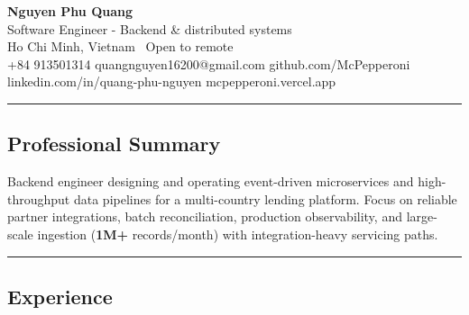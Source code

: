 \documentclass[10pt,letterpaper]{article}
\newcommand{\resumesectionrule}{%
  \par\vspace{0.18em}%
  \noindent\rule{\linewidth}{0.4pt}\par
  \vspace{0.24em}%
}
\begin{document}
\begin{center}
      {\LARGE \textbf{Nguyen Phu Quang}}\\
      \vspace{0.2cm}
      Software Engineer - Backend \& distributed systems\\
      \vspace{0.1cm}
      {\small Ho Chi Minh, Vietnam \textbullet\ Open to remote}
      \vspace{0.35cm}
      \\
      {\small +84 913501314 \quad\textbullet\quad quangnguyen16200@gmail.com \quad\textbullet\quad github.com/McPepperoni \quad\textbullet\quad linkedin.com/in/quang-phu-nguyen \quad\textbullet\quad mcpepperoni.vercel.app}
\end{center}
\resumesectionrule
\subsection*{\Large Professional Summary}
{\small\RaggedRight
      Backend engineer designing and operating event-driven microservices and high-throughput data pipelines for a multi-country lending platform. Focus on reliable partner integrations, batch reconciliation, production observability, and large-scale ingestion (\textbf{1M+} records/month) with integration-heavy servicing paths.
      \par}
\resumesectionrule
\subsection*{\Large Experience}
\end{document}
